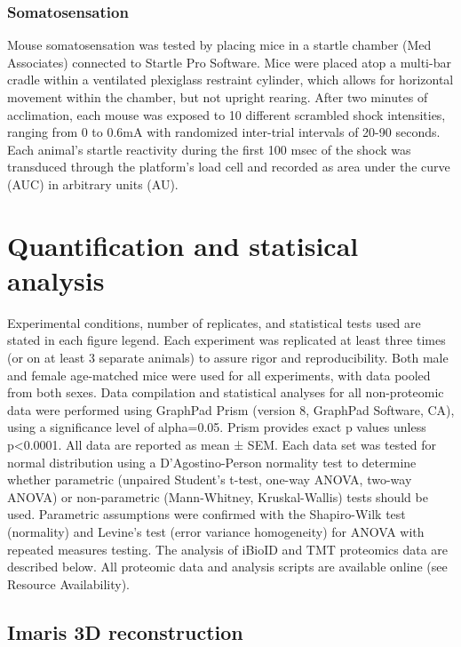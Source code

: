 \subsubsection{Somatosensation}
Mouse somatosensation was tested by placing mice in a startle
chamber (Med Associates) connected to Startle Pro Software. Mice were placed
atop a multi-bar cradle within a ventilated plexiglass restraint cylinder, which
allows for horizontal movement within the chamber, but not upright rearing.
After two minutes of acclimation, each mouse was exposed to 10 different
scrambled shock intensities, ranging from 0 to 0.6mA with randomized inter-trial
intervals of 20-90 seconds. Each animal’s startle reactivity during the first
100 msec of the shock was transduced through the platform’s load cell and
recorded as area under the curve (AUC) in arbitrary units (AU). 

\section{Quantification and statisical analysis}

Experimental conditions, number of replicates, and statistical tests used are
stated in each figure legend. Each experiment was replicated at least three
times (or on at least 3 separate animals) to assure rigor and reproducibility.
Both male and female age-matched mice were used for all experiments, with data
pooled from both sexes. Data compilation and statistical analyses for all
non-proteomic data were performed using GraphPad Prism (version 8, GraphPad
Software, CA), using a significance level of alpha=0.05. Prism provides exact p
values unless p<0.0001. All data are reported as mean ± SEM. Each data set was
tested for normal distribution using a D'Agostino-Person normality test to
determine whether parametric (unpaired Student's t-test, one-way ANOVA, two-way
ANOVA) or non-parametric (Mann-Whitney, Kruskal-Wallis) tests should be used.
Parametric assumptions were confirmed with the Shapiro-Wilk test (normality) and
Levine's test (error variance homogeneity) for ANOVA with repeated measures
testing. The analysis of iBioID and TMT proteomics data are described below. All
proteomic data and analysis scripts are available online (see Resource
Availability).

\subsection{Imaris 3D reconstruction}

